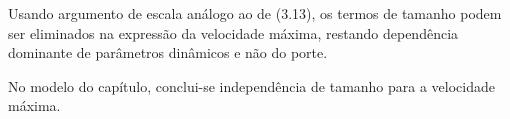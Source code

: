Usando argumento de escala análogo ao de (3.13), os termos de tamanho podem ser eliminados na expressão da velocidade máxima, restando dependência dominante de parâmetros dinâmicos e não do porte.

No modelo do capítulo, conclui-se independência de tamanho para a velocidade máxima.

